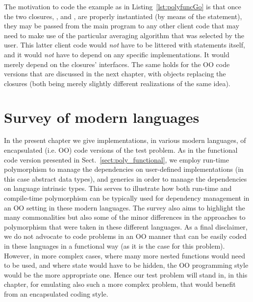 \documentclass[11pt,oneside]{report}
\newcommand{\code}[1]{{\selectfont\ttfamily{#1}}}
\begin{document}


The motivation to code the example as in Listing~\ref{lst:polyfuncGo}
is that once the two closures, \code{avi}, and \code{avf}, are properly
instantiated (by means of the \code{switch} statement), they may be
passed from the main program to any other client code that may need to
make use of the particular averaging algorithm that was selected by
the user. This latter client code would \emph{not} have to be littered
with \code{switch} statements itself, and it would \emph{not} have to
depend on any specific implementations. It would merely depend on the
closures' interfaces. The same holds for the OO code versions that are
discussed in the next chapter, with objects replacing the closures
(both being merely slightly different realizations of the same idea).

\chapter{Survey of modern languages}
\label{sect:survey}

In the present chapter we give implementations, in various modern
languages, of encapsulated (i.e. OO) code versions of the test
problem. As in the functional code version presented in
Sect.~\ref{sect:poly_functional}, we employ run-time polymorphism to
manage the dependencies on user-defined implementations (in this case
abstract data types), and generics in order to manage the dependencies
on language intrinsic types. This serves to illustrate how both
run-time and compile-time polymorphism can be typically used for
dependency management in an OO setting in these modern languages. The
survey also aims to highlight the many commonalities but also some
of the minor differences in the approaches to polymorphism that were
taken in these different languages. As a final disclaimer, we do not
advocate to code problems in an OO manner that can be easily coded in
these languages in a functional way (as it is the case for this
problem). However, in more complex cases, where many more nested
functions would need to be used, and where state would have to be
hidden, the OO programming style would be the more appropriate
one. Hence our test problem will stand in, in this chapter, for
emulating also such a more complex problem, that would benefit from an
encapsulated coding style.
\end{document}
